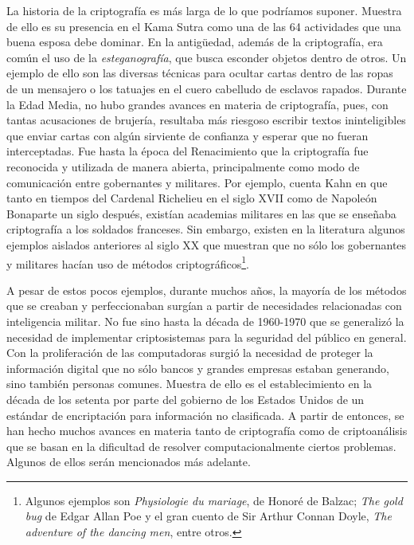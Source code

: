 
\bigskip La historia de la criptografía es más larga de lo que podríamos suponer. Muestra de ello es su presencia en el Kama Sutra \cite{kama} como una de las 64 actividades que una buena esposa debe dominar. En la antigüedad, además de la criptografía, era común el uso de la \textsl{esteganografía}, que busca esconder objetos dentro de otros. Un ejemplo de ello son las diversas técnicas para ocultar cartas dentro de las ropas de un mensajero o los tatuajes en el cuero cabelludo de esclavos rapados. Durante la Edad Media, no hubo grandes avances en materia de criptografía, pues, con tantas acusaciones de brujería, resultaba más riesgoso escribir textos ininteligibles que enviar cartas con algún sirviente de confianza y esperar que no fueran interceptadas. Fue hasta la época del Renacimiento que la criptografía fue reconocida y utilizada de manera abierta, principalmente como modo de comunicación entre gobernantes y militares. Por ejemplo, cuenta Kahn en \cite{kahn} que tanto en tiempos del Cardenal Richelieu en el siglo XVII como de Napoleón Bonaparte un siglo después, existían academias militares en las que se enseñaba criptografía a los soldados franceses. Sin embargo, existen en la literatura algunos ejemplos aislados anteriores al siglo XX que muestran que no sólo los gobernantes y militares hacían uso de métodos criptográficos\footnote{Algunos ejemplos son \textsl{Physiologie du mariage}, de Honoré de Balzac; \textsl{The gold bug} de Edgar Allan Poe y el gran cuento de Sir Arthur Connan Doyle, \textsl{The adventure of the dancing men}, entre otros.}. 

\bigskip A pesar de estos pocos ejemplos, durante muchos años, la mayoría de los métodos que se creaban y perfeccionaban surgían a partir de necesidades relacionadas con inteligencia militar. No fue sino hasta la década de 1960-1970 que se generalizó la necesidad de implementar criptosistemas para la seguridad del público en general. Con la proliferación de las computadoras surgió la necesidad de proteger la información digital que no sólo bancos y grandes empresas estaban generando, sino también personas comunes. Muestra de ello es el establecimiento en la década de los setenta por parte del gobierno de los Estados Unidos de un estándar de encriptación para información no clasificada. A partir de entonces, se han hecho muchos avances en materia tanto de criptografía como de criptoanálisis que se basan en la dificultad de resolver computacionalmente ciertos problemas. Algunos de ellos serán mencionados más adelante.


